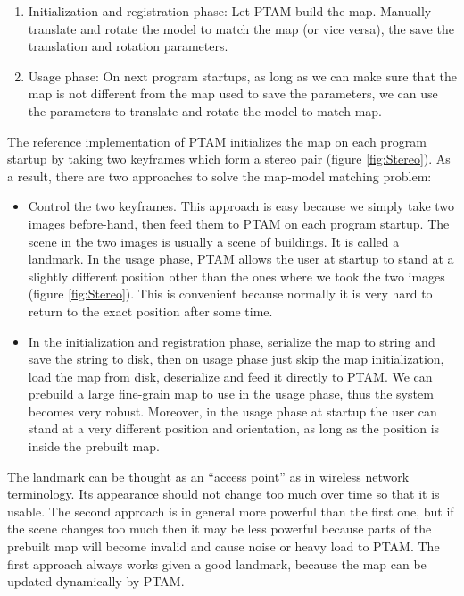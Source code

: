 \begin{enumerate}
	\item Initialization and registration phase: Let PTAM build the map. Manually translate and rotate the model to match the map (or vice versa), the save the translation and rotation parameters.
	\item Usage phase: On next program startups, as long as we can make sure that the map is not different from the map used to save the parameters, we can use the parameters to translate and rotate the model to match map.
\end{enumerate}

The reference implementation of PTAM initializes the map on each program startup by taking two keyframes which form a stereo pair (figure \ref{fig:Stereo}). As a result, there are two approaches to solve the map-model matching problem:

\begin{itemize}
	\item Control the two keyframes. This approach is easy because we simply take two images before-hand, then feed them to PTAM on each program startup. The scene in the two images is usually a scene of buildings. It is called a landmark. In the usage phase, PTAM allows the user at startup to stand at a slightly different position other than the ones where we took the two images (figure \ref{fig:Stereo}). This is convenient because normally it is very hard to return to the exact position after some time.
	\item In the initialization and registration phase, serialize the map to string and save the string to disk, then on usage phase just skip the map initialization, load the map from disk, deserialize and feed it directly to PTAM. We can prebuild a large fine-grain map to use in the usage phase, thus the system becomes very robust. Moreover, in the usage phase at startup the user can stand at a very different position and orientation, as long as the position is inside the prebuilt map.
\end{itemize}

The landmark can be thought as an ``access point'' as in wireless network terminology. Its appearance should not change too much over time so that it is usable. The second approach is in general more powerful than the first one, but if the scene changes too much then it may be less powerful because parts of the prebuilt map will become invalid and cause noise or heavy load to PTAM. The first approach always works given a good landmark, because the map can be updated dynamically by PTAM.


